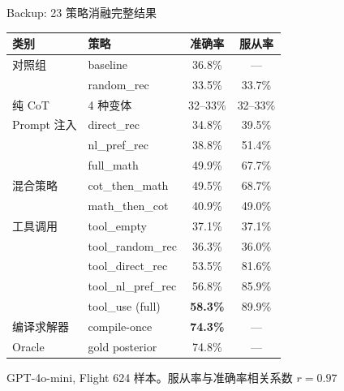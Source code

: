 \documentclass[aspectratio=169,10pt]{beamer}
\begin{document}
\begin{frame}{Backup: 23 策略消融完整结果}
\vspace{2pt}

{\scriptsize
\begin{center}
\begin{tabular}{@{}llcc@{}}
\toprule
类别 & 策略 & 准确率 & 服从率 \\
\midrule
对照组 & baseline & 36.8\% & --- \\
 & random\_rec & 33.5\% & 33.7\% \\
\midrule
纯 CoT & 4 种变体 & 32--33\% & 32--33\% \\
\midrule
Prompt 注入 & direct\_rec & 34.8\% & 39.5\% \\
 & nl\_pref\_rec & 38.8\% & 51.4\% \\
 & full\_math & 49.9\% & 67.7\% \\
\midrule
混合策略 & cot\_then\_math & 49.5\% & 68.7\% \\
 & math\_then\_cot & 40.9\% & 49.0\% \\
\midrule
工具调用 & tool\_empty & 37.1\% & 37.1\% \\
 & tool\_random\_rec & 36.3\% & 36.0\% \\
 & tool\_direct\_rec & 53.5\% & 81.6\% \\
 & tool\_nl\_pref\_rec & 56.8\% & 85.9\% \\
 & tool\_use (full) & \textbf{58.3\%} & 89.9\% \\
\midrule
编译求解器 & compile-once & \textbf{74.3\%} & --- \\
Oracle & gold posterior & 74.8\% & --- \\
\bottomrule
\end{tabular}
\end{center}}

{\scriptsize GPT-4o-mini, Flight 624 样本。服从率与准确率相关系数 $r = 0.97$}
\end{frame}
\end{document}
